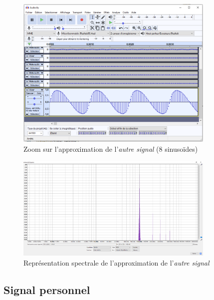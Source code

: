 \documentclass[a4paper]{article}
\begin{document}
\begin{figure}[H]
    \centering
    \includegraphics[width=0.85\textwidth]{images/AutreSignal006.PNG}
    \caption{Zoom sur l'approximation de l'\textit{autre signal} (8 sinusoïdes)}
    \label{fig:AutreSignal006}
\end{figure}

\begin{figure}[H]
    \centering
    \includegraphics[width=0.85\textwidth]{images/AutreSignal007.PNG}
    \caption{Représentation spectrale de l'approximation de l'\textit{autre signal}}
    \label{fig:AutreSignal007}
\end{figure}











\subsection{Signal personnel}
\end{document}
